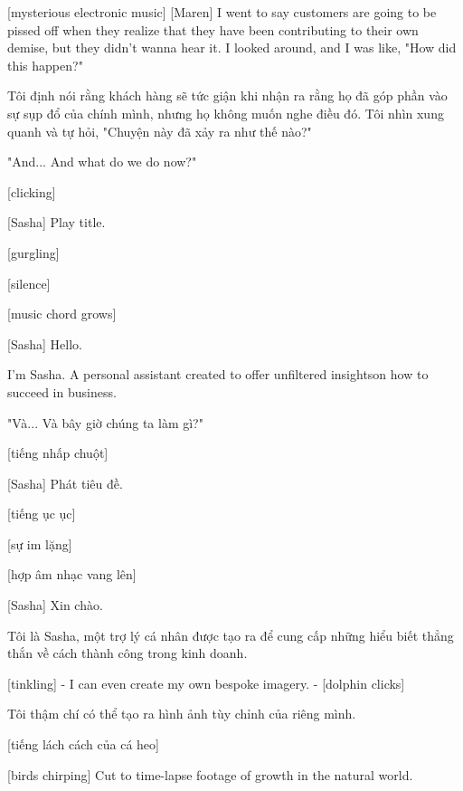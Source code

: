 \documentclass[a4paper]{article}
\begin{document}
	[mysterious electronic music]
	[Maren] I went to say customers are going to be pissed off when they realize that they have been contributing to their own demise, but they didn't wanna hear it. I looked around, and I was like, "How did this happen?" 
	
	\begin{vietnamese-v2}
		[Maren] Tôi định nói rằng khách hàng sẽ tức giận khi nhận ra rằng họ đã góp phần vào sự sụp đổ của chính mình, nhưng họ không muốn nghe điều đó. Tôi nhìn xung quanh và tự hỏi, "Chuyện này đã xảy ra như thế nào?"
	\end{vietnamese-v2}
	
	"And... And what do we do now?"
	
	[clicking]
	
	[Sasha] Play title.
	
	[gurgling]
	
	[silence]
	
	[music chord grows]
	
	[Sasha] Hello.
	
	I'm Sasha. A personal assistant created to offer unfiltered insights\footnotemark[5] on how to succeed in business.
	
	\begin{vietnamese-v2}
		"Và... Và bây giờ chúng ta làm gì?"
		
		[tiếng nhấp chuột]
		
		[Sasha] Phát tiêu đề.
		
		[tiếng ục ục]
		
		[sự im lặng]
		
		[hợp âm nhạc vang lên]
		
		[Sasha] Xin chào.
		
		Tôi là Sasha, một trợ lý cá nhân được tạo ra để cung cấp những hiểu biết thẳng thắn về cách thành công trong kinh doanh.
	\end{vietnamese-v2}
	
	
	
	[tinkling]
	- I can even create my own bespoke imagery. 
	- [dolphin clicks]
	
	\begin{vietnamese-v2}
		
		Tôi thậm chí có thể tạo ra hình ảnh tùy chỉnh của riêng mình.
		
		[tiếng lách cách của cá heo]
	\end{vietnamese-v2}
	
	[birds chirping]
	Cut to time-lapse footage of growth in the natural world.
	
\end{document}
